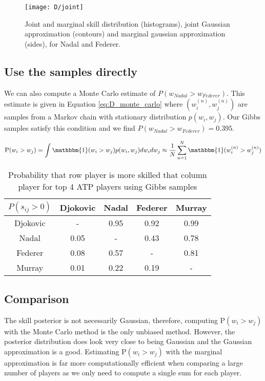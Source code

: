 \documentclass[11pt]{article}
\begin{document}
\begin{figure}
    \centering
    \texttt{[image: D/joint]}
    \caption{Joint and marginal skill distribution (histograms), joint Gaussian approximation (contours) and marginal gaussian approximation (sides), for Nadal and Federer.}
    \label{fig:D_joint}
\end{figure}

\subsection{Use the samples directly}
We can also compute a Monte Carlo estimate of $P(w_{Nadal} > w_{Federer})$. This estimate is given in Equation \ref{eq:D_monte_carlo} where $(w_{i}^{(n)}, w_{j}^{(n)})$ are samples from a Markov chain with stationary distribution $p(w_{i}, w_{j})$. Our Gibbs samples satisfy this condition and we find $P(w_{Nadal} > w_{Federer}) = 0.395$.

\begin{equation}
    \text{P}(w_{i} > w_{j}) = \int \mathbbm{1}(w_{i} > w_{j}) p(w_{i}, w_{j}) dw_{i} dw_{j} \approx \frac{1}{N} \sum_{n=1}^{N} \mathbbm{1}(w_{i}^{(n)} > w_{j}^{(n)})
    \label{eq:D_monte_carlo}
\end{equation}

\begin{table}
    \centering
    \small
    \setlength{\tabcolsep}{2pt}
    \begin{tabular}{|c|c c c c|}
        \hline
        $P(s_{ij}>0)$ & Djokovic & Nadal & Federer & Murray \\
        \hline
        Djokovic & -    & 0.95 & 0.92 & 0.99 \\
        Nadal    & 0.05 & -    & 0.43 & 0.78 \\
        Federer  & 0.08 & 0.57 & -    & 0.81 \\
        Murray   & 0.01 & 0.22 & 0.19 & -    \\
        \hline
    \end{tabular}
    \caption{Probability that row player is more skilled that column player for top 4 ATP players using Gibbs samples}
    \label{tbl:D_skill_difference}
\end{table}

\subsection{Comparison}
The skill posterior is not necessarily Gaussian, therefore, computing $\text{P}(w_{i} > w_{j})$ with the Monte Carlo method is the only unbiased method. However, the posterior distribution does look very close to being Gaussian and the Gaussian approximation is a good. Estimating $\text{P}(w_{i} > w_{j})$ with the marginal approximation is far more computationally efficient when comparing a large number of players as we only need to compute a single sum for each player.
\end{document}
